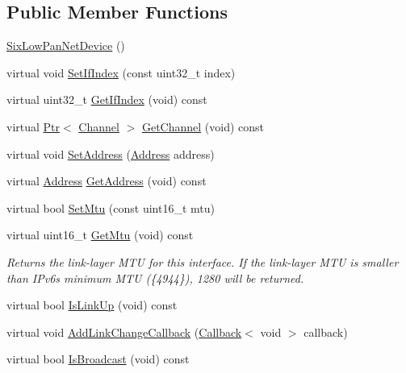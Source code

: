 \subsection*{Public Member Functions}
\begin{DoxyCompactItemize}
\item 
\hyperlink{classns3_1_1SixLowPanNetDevice_afb90a509d87f24373689a40f459d7ff6}{Six\+Low\+Pan\+Net\+Device} ()
\item 
virtual void \hyperlink{classns3_1_1SixLowPanNetDevice_ac836f6782ebbcbb1c40300b16e0c933b}{Set\+If\+Index} (const uint32\+\_\+t index)
\item 
virtual uint32\+\_\+t \hyperlink{classns3_1_1SixLowPanNetDevice_a48cd7b76a59b506df8d8a7d8604f66b3}{Get\+If\+Index} (void) const 
\item 
virtual \hyperlink{classns3_1_1Ptr}{Ptr}$<$ \hyperlink{classns3_1_1Channel}{Channel} $>$ \hyperlink{classns3_1_1SixLowPanNetDevice_a95e2b09c9a58f4e22d930a520b9c65f0}{Get\+Channel} (void) const 
\item 
virtual void \hyperlink{classns3_1_1SixLowPanNetDevice_abad3bea50f75add62ceeab5c37b30c73}{Set\+Address} (\hyperlink{classns3_1_1Address}{Address} address)
\item 
virtual \hyperlink{classns3_1_1Address}{Address} \hyperlink{classns3_1_1SixLowPanNetDevice_a9a825d55acb0ae6fe46fa34bb8a5ae57}{Get\+Address} (void) const 
\item 
virtual bool \hyperlink{classns3_1_1SixLowPanNetDevice_aae0319d38c749f66790e16691aa39a0c}{Set\+Mtu} (const uint16\+\_\+t mtu)
\item 
virtual uint16\+\_\+t \hyperlink{classns3_1_1SixLowPanNetDevice_a2808676aba45f55858ba1cee97c4104e}{Get\+Mtu} (void) const 
\begin{DoxyCompactList}\small\item\em Returns the link-\/layer M\+TU for this interface. If the link-\/layer M\+TU is smaller than I\+Pv6\textquotesingle{}s minimum M\+TU (\{4944\}), 1280 will be returned. \end{DoxyCompactList}\item 
virtual bool \hyperlink{classns3_1_1SixLowPanNetDevice_a24b0b22a73b507d8b11e9890d59c9454}{Is\+Link\+Up} (void) const 
\item 
virtual void \hyperlink{classns3_1_1SixLowPanNetDevice_a625e3de0641321b6d1ca0ff57552ba63}{Add\+Link\+Change\+Callback} (\hyperlink{classns3_1_1Callback}{Callback}$<$ void $>$ callback)
\item 
virtual bool \hyperlink{classns3_1_1SixLowPanNetDevice_a4103f55b3b04c080c645514c7ab66d3f}{Is\+Broadcast} (void) const 

\end{DoxyCompactItemize}
